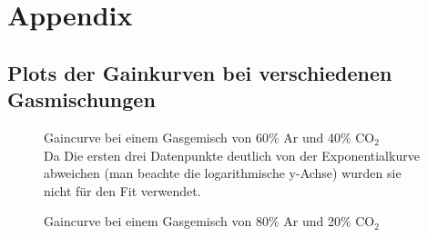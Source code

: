\section{Appendix}
\subsection{Plots der Gainkurven bei verschiedenen Gasmischungen}
\label{kap:Gainkurven-Gas}
\begin{figure}[ht]
    \centering
    
    \caption{Gaincurve bei einem Gasgemisch von 60\% Ar und 40\% $\text{CO}_2$\\ Da Die ersten drei Datenpunkte deutlich von der Exponentialkurve abweichen (man beachte die logarithmische y-Achse) wurden sie nicht für den Fit verwendet.}
    \label{fig:CO2_60_40}
\end{figure}
\begin{figure}[ht]
    \centering
    
    \caption{Gaincurve bei einem Gasgemisch von 80\% Ar und 20\% $\text{CO}_2$}
    \label{fig:CO2_80_20}
\end{figure}